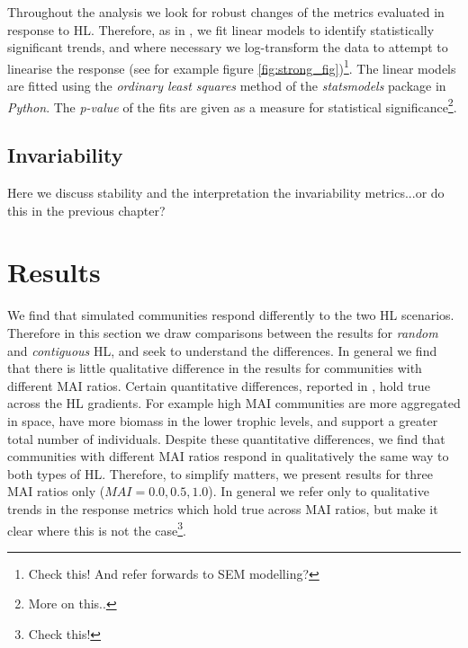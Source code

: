 Throughout the analysis we look for robust changes of the metrics evaluated in response to HL. Therefore, as in \cite{lurgi2015effects}, we fit linear models to identify statistically significant trends, and where necessary we log-transform the data to attempt to linearise the response (see for example figure \ref{fig:strong_fig})\footnote{Check this! And refer forwards to SEM modelling?}. The linear models are fitted using the \emph{ordinary least squares} method of the \emph{statsmodels} package in \emph{Python}. The \emph{p-value} of the fits are given as a measure for statistical significance\footnote{More on this..}.

\subsection{Invariability}
\label{sec:stability}

Here we discuss stability and the interpretation the invariability metrics...or do this in the previous chapter?

\section{Results}
\label{sec:results}

We find that simulated communities respond differently to the two HL scenarios. Therefore in this section we draw comparisons between the results for \emph{random} and \emph{contiguous} HL, and seek to understand the differences. In general we find that there is little qualitative difference in the results for communities with different MAI ratios. Certain quantitative differences, reported in \cite{lurgi2015effects}, hold true across the HL gradients. For example high MAI communities are more aggregated in space, have more biomass in the lower trophic levels, and support a greater total number of individuals. Despite these quantitative differences, we find that communities with different MAI ratios respond in qualitatively the same way to both types of HL. Therefore, to simplify matters, we present results for three MAI ratios only ($MAI=0.0,0.5,1.0$). In general we refer only to qualitative trends in the response metrics which hold true across MAI ratios, but make it clear where this is not the case\footnote{Check this!}.

